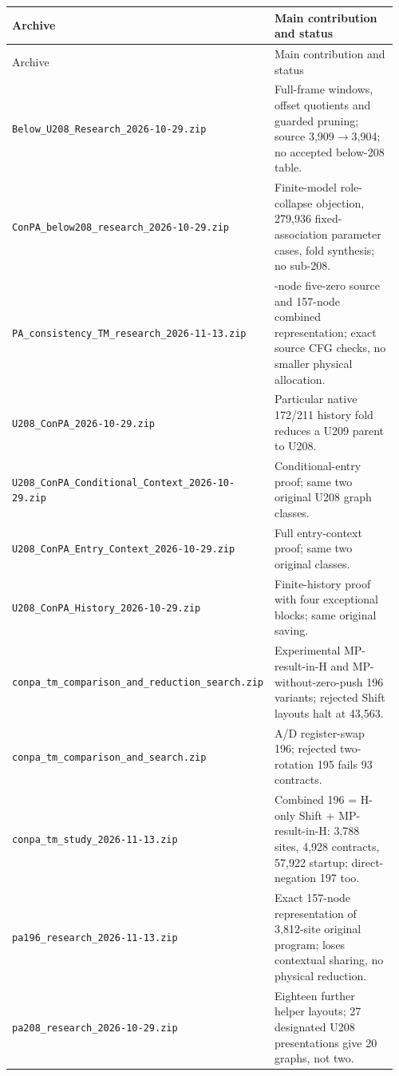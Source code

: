 \begingroup\footnotesize
\begin{longtable}{@{}>{\raggedright\arraybackslash}p{0.45\linewidth}>{\raggedright\arraybackslash}p{0.51\linewidth}@{}}
\toprule Archive & Main contribution and status\\\midrule\endfirsthead
\toprule Archive & Main contribution and status\\\midrule\endhead
\bottomrule\endfoot
\nolinkurl{Below_U208_Research_2026-10-29.zip} & Full-frame windows, offset quotients and guarded pruning; source 3,909$\to$3,904; no accepted below-208 table.\\[3pt]
\nolinkurl{ConPA_below208_research_2026-10-29.zip} & Finite-model role-collapse objection, 279,936 fixed-association parameter cases, fold synthesis; no sub-208.\\[3pt]
\nolinkurl{PA_consistency_TM_research_2026-11-13.zip} & 159-node five-zero source and 157-node combined representation; exact source CFG checks, no smaller physical allocation.\\[3pt]
\nolinkurl{U208_ConPA_2026-10-29.zip} & Particular native 172/211 history fold reduces a U209 parent to U208.\\[3pt]
\nolinkurl{U208_ConPA_Conditional_Context_2026-10-29.zip} & Conditional-entry proof; same two original U208 graph classes.\\[3pt]
\nolinkurl{U208_ConPA_Entry_Context_2026-10-29.zip} & Full entry-context proof; same two original classes.\\[3pt]
\nolinkurl{U208_ConPA_History_2026-10-29.zip} & Finite-history proof with four exceptional blocks; same original saving.\\[3pt]
\nolinkurl{conpa_tm_comparison_and_reduction_search.zip} & Experimental MP-result-in-H and MP-without-zero-push 196 variants; rejected Shift layouts halt at 43,563.\\[3pt]
\nolinkurl{conpa_tm_comparison_and_search.zip} & A/D register-swap 196; rejected two-rotation 195 fails 93 contracts.\\[3pt]
\nolinkurl{conpa_tm_study_2026-11-13.zip} & Combined 196 = H-only Shift + MP-result-in-H: 3,788 sites, 4,928 contracts, 57,922 startup; direct-negation 197 too.\\[3pt]
\nolinkurl{pa196_research_2026-11-13.zip} & Exact 157-node representation of 3,812-site original program; loses contextual sharing, no physical reduction.\\[3pt]
\nolinkurl{pa208_research_2026-10-29.zip} & Eighteen further helper layouts; 27 designated U208 presentations give 20 graphs, not two.\\[3pt]

\end{longtable}
